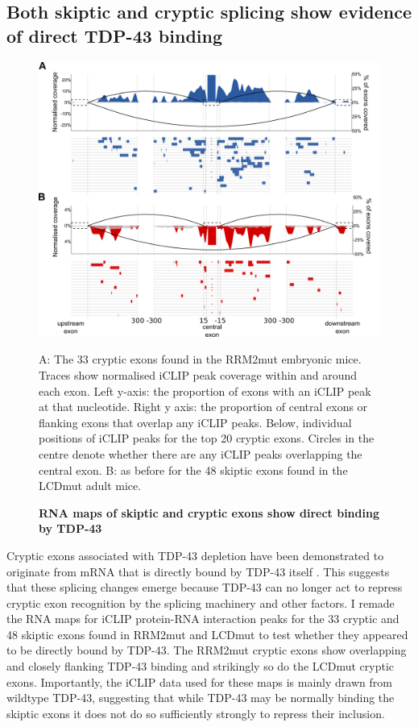 \subsection{Both skiptic and cryptic splicing show evidence of direct TDP-43 binding}

\begin{figure}[h!]
	\centering
	\includegraphics[width=\textwidth]{Figures/05_tdp_mice/iclip_multipanel.png}
	\caption{\textbf{RNA maps of skiptic and cryptic exons show direct binding by TDP-43}}
	A: The 33 cryptic exons found in the RRM2mut embryonic mice. Traces show normalised iCLIP peak coverage within and around each exon. Left y-axis: the proportion of exons with an iCLIP peak at that nucleotide. Right y axis: the proportion of central exons or flanking exons that overlap any iCLIP peaks. Below, individual positions of iCLIP peaks for the top 20 cryptic exons. Circles in the centre denote whether there are any iCLIP peaks overlapping the central exon. B: as before for the 48 skiptic exons found in the LCDmut adult mice.
	\label{iclip_multi}
\end{figure}

Cryptic exons associated with TDP-43 depletion have been demonstrated to originate from mRNA that is directly bound by TDP-43 itself \citep{Ling2015}. 
This suggests that these splicing changes emerge because TDP-43 can no longer act to repress cryptic exon recognition by the splicing machinery and other factors. 
I remade the RNA maps for iCLIP protein-RNA interaction peaks for the 33 cryptic and 48 skiptic exons found in RRM2mut and LCDmut to test whether they appeared to be directly bound by TDP-43. 
The RRM2mut cryptic exons show overlapping and closely flanking TDP-43 binding and strikingly so do the LCDmut cryptic exons. 
Importantly, the iCLIP data used for these maps is mainly drawn from wildtype TDP-43, suggesting that while TDP-43 may be normally binding the skiptic exons it does not do so sufficiently strongly to repress their inclusion. 

